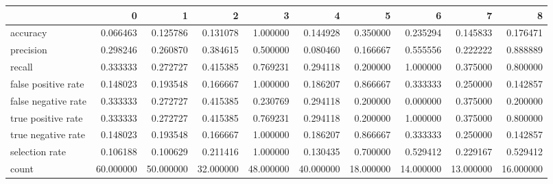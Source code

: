\begin{tabular}{lrrrrrrrrr}
\toprule
{} &          0 &          1 &          2 &          3 &          4 &          5 &          6 &          7 &          8 \\
\midrule
accuracy            &   0.066463 &   0.125786 &   0.131078 &   1.000000 &   0.144928 &   0.350000 &   0.235294 &   0.145833 &   0.176471 \\
precision           &   0.298246 &   0.260870 &   0.384615 &   0.500000 &   0.080460 &   0.166667 &   0.555556 &   0.222222 &   0.888889 \\
recall              &   0.333333 &   0.272727 &   0.415385 &   0.769231 &   0.294118 &   0.200000 &   1.000000 &   0.375000 &   0.800000 \\
false positive rate &   0.148023 &   0.193548 &   0.166667 &   1.000000 &   0.186207 &   0.866667 &   0.333333 &   0.250000 &   0.142857 \\
false negative rate &   0.333333 &   0.272727 &   0.415385 &   0.230769 &   0.294118 &   0.200000 &   0.000000 &   0.375000 &   0.200000 \\
true positive rate  &   0.333333 &   0.272727 &   0.415385 &   0.769231 &   0.294118 &   0.200000 &   1.000000 &   0.375000 &   0.800000 \\
true negative rate  &   0.148023 &   0.193548 &   0.166667 &   1.000000 &   0.186207 &   0.866667 &   0.333333 &   0.250000 &   0.142857 \\
selection rate      &   0.106188 &   0.100629 &   0.211416 &   1.000000 &   0.130435 &   0.700000 &   0.529412 &   0.229167 &   0.529412 \\
count               &  60.000000 &  50.000000 &  32.000000 &  48.000000 &  40.000000 &  18.000000 &  14.000000 &  13.000000 &  16.000000 \\
\bottomrule
\end{tabular}
